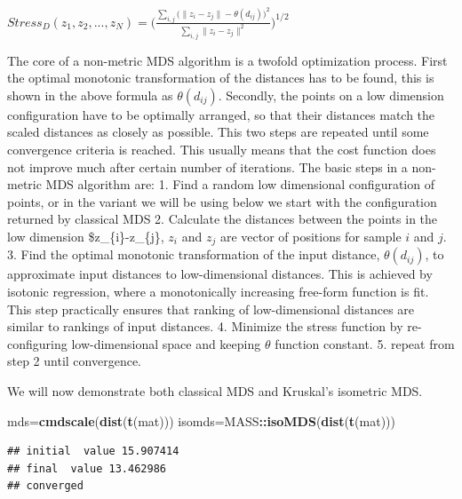 \documentclass[12pt,]{krantz}
\newenvironment{Shaded}{\begin{snugshade}}{\end{snugshade}}
\newcommand{\KeywordTok}[1]{\textcolor[rgb]{0.13,0.29,0.53}{\textbf{#1}}}
\newcommand{\NormalTok}[1]{#1}
\newcommand{\OperatorTok}[1]{\textcolor[rgb]{0.81,0.36,0.00}{\textbf{#1}}}
\begin{document}
\({\displaystyle Stress_{D}(z_{1},z_{2},...,z_{N})={\Biggl (}{\frac {\sum _{i,j}{\bigl (}\|z_{i}-z_{j}\|-\theta(d_{ij}){\bigr )}^{2}}{\sum _{i,j}\|z_{i}-z_{j}\|^{2}}}{\Biggr )}^{1/2}}\)

The core of a non-metric MDS algorithm is a twofold optimization process. First the optimal monotonic transformation of the distances has to be found, this is shown in the above formula as \(\theta(d_{ij})\). Secondly, the points on a low dimension configuration have to be optimally arranged, so that their distances match the scaled distances as closely as possible. This two steps are repeated until some convergence criteria is reached. This usually means that the cost function does not improve much after certain number of iterations. The basic steps in a non-metric MDS algorithm are:
1. Find a random low dimensional configuration of points, or in the variant we will be using below we start with the configuration returned by classical MDS
2. Calculate the distances between the points in the low dimension \$\textbar{}z\_\{i\}-z\_\{j\}\textbar{}, \(z_{i}\) and \(z_{j}\) are vector of positions for sample \(i\) and \(j\).
3. Find the optimal monotonic transformation of the input distance, \({\textstyle \theta(d_{ij})}\), to approximate input distances to low-dimensional distances. This is achieved by isotonic regression, where a monotonically increasing free-form function is fit. This step practically ensures that ranking of low-dimensional distances are similar to rankings of input distances.
4. Minimize the stress function by re-configuring low-dimensional space and keeping \(\theta\) function constant.
5. repeat from step 2 until convergence.

We will now demonstrate both classical MDS and Kruskal's isometric MDS.

\begin{Shaded}
\begin{Highlighting}[]
\NormalTok{mds=}\KeywordTok{cmdscale}\NormalTok{(}\KeywordTok{dist}\NormalTok{(}\KeywordTok{t}\NormalTok{(mat)))}
\NormalTok{isomds=MASS}\OperatorTok{::}\KeywordTok{isoMDS}\NormalTok{(}\KeywordTok{dist}\NormalTok{(}\KeywordTok{t}\NormalTok{(mat)))}
\end{Highlighting}
\end{Shaded}

\begin{verbatim}
## initial  value 15.907414 
## final  value 13.462986 
## converged
\end{verbatim}
\end{document}
